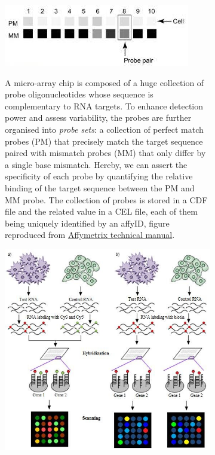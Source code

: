\begin{figure}
     \centering
     \begin{subfigure}[p]{0.2\textwidth}
         \centering
         \includegraphics[width=\textwidth]{figures/biological_introduction/probe_structure.jpg}
         \label{subfig:probe-structure}
         \caption[\textbf{Probe set structure}]{A micro-array chip is composed of a huge collection of probe oligonucleotides whose sequence is complementary to RNA targets. 
         To enhance detection power and assess variability, the probes are further organised into \textit{probe sets}:  a collection of perfect match probes (PM) that precisely match the target sequence paired with mismatch probes (MM) that only differ by a single base mismatch.
         Hereby, we can assert the specificity of each probe by quantifying the relative binding of the target sequence between the PM and MM probe. 
         The collection of probes is stored in a CDF file and the related value in a CEL file, each of them being uniquely identified by an affyID, figure reproduced from \href{https://www.affymetrix.com/support/downloads/manuals/chas_2_1_user_manual.pdf}{Affymetrix technical manual}.}
     \end{subfigure}
     \hfill
     \begin{subfigure}[p]{0.55\textwidth}
         \centering
         \includegraphics[width=\textwidth]{figures/biological_introduction/Microarray-Hybridization-using-a-two-channel-and-b-single-channel-microarray.png}

\end{subfigure}
\end{figure}
